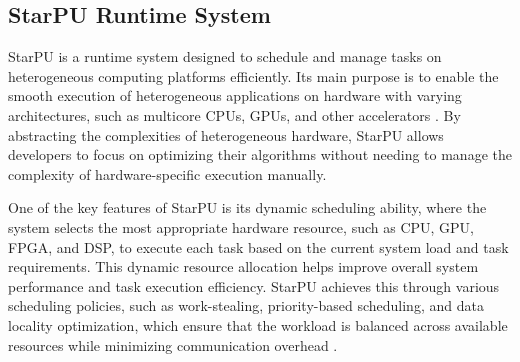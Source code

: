 \documentclass[conference]{IEEEtran}
\begin{document}

\subsection{StarPU Runtime System}

StarPU is a runtime system designed to schedule and manage tasks on heterogeneous computing platforms efficiently. Its main purpose is to enable the smooth execution of heterogeneous applications on hardware with varying architectures, such as multicore CPUs, GPUs, and other accelerators \cite{augonnet2009}. By abstracting the complexities of heterogeneous hardware, StarPU allows developers to focus on optimizing their algorithms without needing to manage the complexity of hardware-specific execution manually.

One of the key features of StarPU is its dynamic scheduling ability, where the system selects the most appropriate hardware resource, such as CPU, GPU, FPGA, and DSP, to execute each task based on the current system load and task requirements. This dynamic resource allocation helps improve overall system performance and task execution efficiency. StarPU achieves this through various scheduling policies, such as work-stealing, priority-based scheduling, and data locality optimization, which ensure that the workload is balanced across available resources while minimizing communication overhead \cite{StarPU}.

\end{document}
